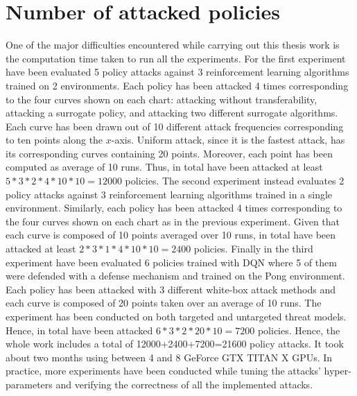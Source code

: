\section{Number of attacked policies}
One of the major difficulties encountered while carrying out this thesis work is the computation time taken to run all the experiments. For the first experiment have been evaluated 5 policy attacks against 3 reinforcement learning algorithms trained on 2 environments. Each policy has been attacked 4 times corresponding to the four curves shown on each chart: attacking without transferability, attacking a surrogate policy, and attacking two different surrogate algorithms. Each curve has been drawn out of 10 different attack frequencies corresponding to ten points along the \(x\)-axis. Uniform attack, since it is the fastest attack, has its corresponding curves containing 20 points. Moreover, each point has been computed as average of 10 runs. Thus, in total have been attacked at least \(5*3*2*4*10*10=12000\) policies. The second experiment instead evaluates 2 policy attacks against 3 reinforcement learning algorithms trained in a single environment. Similarly, each policy has been attacked 4 times corresponding to the four curves shown on each chart as in the previous experiment. Given that each curve is composed of 10 points averaged over 10 runs, in total have been attacked at least \( 2*3*1*4*10*10=2400\) policies. Finally in the third experiment have been evaluated 6 policies trained with DQN where 5 of them were defended with a defense mechanism and trained on the Pong environment. Each policy has been attacked with 3 different white-box attack methods and each curve is composed of 20 points taken over an average of 10 runs. The experiment has been conducted on both targeted and untargeted threat models. Hence, in total have been attacked \(6*3*2*20*10=7200\) policies. Hence, the whole work includes a total of 12000+2400+7200=21600 policy attacks. It took about two months using between 4 and 8 GeForce GTX TITAN X GPUs. In practice, more experiments have been conducted while tuning the attacks' hyper-parameters and verifying the correctness of all the implemented attacks.

